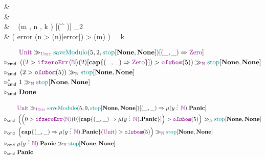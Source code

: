 \begin{codealign}
  &
    \polprd\ \type\ \Unittype\ \where
  \\[-4pt]
  &\quad
    \Unit
  \\
  &
    \
    \saveModulo
    (m \prd \Nat, n \prd \Nat, k \con \Nat)
    [\Unittype \times (\Nat \to^{\polprd} \Nat)]
    \con
    \Unittype
    \coloneq \match_{2}
  \\[-4pt]
  &\quad
    \Unit
    \Rightarrow
    \left(
      \textsf{error}
      \Rightarrow
      (n > \ifzeroErrT\langle \Nat \rangle (n)[\textsf{error}]) > \modulo(m)
    \right)
    \mkCmd_{\Nat}
    k
\end{codealign}

\begin{align*}
  \phantom{\reducesto_{\cmd}}
  &
  \Unit
  \mkCmd_{\Unittype}
  \saveModulo(5, 2, \stopNat[\None, \None])
  [(\_, \_) \Rightarrow \Zero]
  \\
  \reducesto_{\cmd}\
  &
  \left(
    (2 > \ifzeroErrT\langle \Nat \rangle (2)[\capab\{ (\_, \_) \Rightarrow \Zero \}]) > \modulo(5)
  \right)
  \mkCmd_{\Nat}
  \stopNat[\None, \None]
  \\
  \reducesto_{\cmd}\
  &
  \left(
    2 > \modulo(5)
  \right)
  \mkCmd_{\Nat}
  \stopNat[\None, \None]
  \\
  \reducesto_{\cmd}^{\ast}\
  &
  1
  \mkCmd_{\Nat}
  \stopNat[\None, \None]
  \\
  \reducesto_{\cmd}\
  &
  \Done
\end{align*}

\begin{align*}
  \phantom{\reducesto_{\cmd}}
  &
  \Unit
  \mkCmd_{\Unittype}
  \saveModulo(5, 0, \stopNat[\None, \None])
  [(\_, \_) \Rightarrow \muprdabs{y}{\Nat}{\mathbf{Panic}}]
  \\
  \reducesto_{\cmd}\
  &
  \left(
    \left(
      0
      >
      \ifzeroErrT\langle \Nat \rangle (0)
      [\capab\{ (\_, \_) \Rightarrow \muprdabs{y}{\Nat}{\mathbf{Panic}} \}]
    \right)
    >
    \modulo(5)
  \right)
  \mkCmd_{\Nat}
  \stopNat[\None, \None]
  \\
  \reducesto_{\cmd}\
  &
  \left(
    \capab\{ (\_, \_) \Rightarrow \muprdabs{y}{\Nat}{\mathbf{Panic}} \}(\Unit) > \modulo(5)
  \right)
  \mkCmd_{\Nat}
  \stopNat[\None, \None]
  \\
  \reducesto_{\cmd}\
  &
  \muprdabs{y}{\Nat}{\mathbf{Panic}}
  \mkCmd_{\Nat}
  \stopNat[\None, \None]
  \\
  \reducesto_{\cmd}\
  &
  \mathbf{Panic}
\end{align*}

